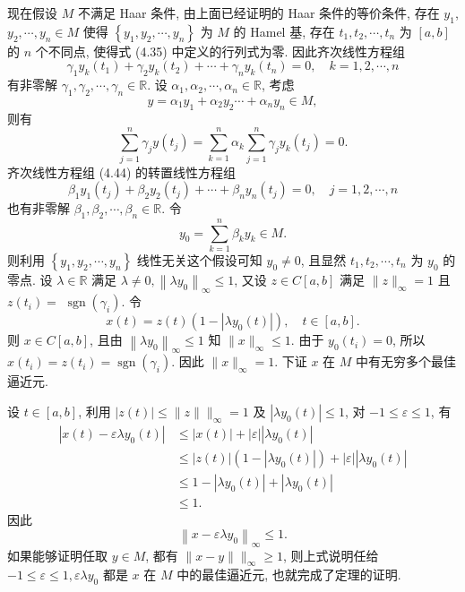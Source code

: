 \documentclass[openany]{ctexbook}
\makeatletter
\theoremstyle{kaiti}
\theoremstyle{normal}
\renewenvironment{proof}[1][\proofname]{\par
    \pushQED{\qed}%
    \normalfont \topsep6\p@\@plus6\p@\relax
    \trivlist
    \item\relax
    {\heiti #1}\hspace{2\labelsep}\ignorespaces
  }{%
    \popQED\endtrivlist\@endpefalse
  }
\makeatother
\begin{document}
\begin{proof}
现在假设 $M$ 不满足 Haar 条件, 由上面已经证明的 Haar 条件的等价条件, 存在 $y_1$, $y_2, \cdots, y_n \in M$ 使得 $\left\{y_1, y_2, \cdots, y_n\right\}$ 为 $M$ 的 Hamel 基, 存在 $t_1, t_2, \cdots, t_n$ 为 $[a, b]$ 的 $n$ 个不同点, 使得式 (4.35) 中定义的行列式为零. 因此齐次线性方程组
\begin{equation}
  \gamma_1 y_{k}\left(t_1\right)+\gamma_2 y_{k}\left(t_2\right)+\cdots+\gamma_n y_{k}\left(t_n\right)=0, \quad k=1,2, \cdots, n
\end{equation}
有非零解 $\gamma_1, \gamma_2, \cdots, \gamma_n \in \mathbb{R}$. 设 $\alpha_1, \alpha_2, \cdots, \alpha_n \in \mathbb{R}$, 考虑
$$
y=\alpha_1 y_1+\alpha_2 y_2 \cdots+\alpha_n y_n \in M,
$$
则有
\begin{equation}
  \sum_{j=1}^n \gamma_{j} y\left(t_{j}\right)=\sum_{k=1}^n \alpha_{k} \sum_{j=1}^n \gamma_{j} y_{k}\left(t_{j}\right)=0.
\end{equation}
齐次线性方程组 (4.44) 的转置线性方程组
$$
\beta_1 y_1\left(t_{j}\right)+\beta_2 y_2\left(t_{j}\right)+\cdots+\beta_n y_n\left(t_{j}\right)=0, \quad j=1,2, \cdots, n
$$
也有非零解 $\beta_1, \beta_2, \cdots, \beta_n \in \mathbb{R}$. 令
$$
y_0=\sum_{k=1}^n \beta_{k} y_{k} \in M.
$$
则利用 $\left\{y_1, y_2, \cdots, y_n\right\}$ 线性无关这个假设可知 $y_0 \neq 0$, 且显然 $t_1, t_2, \cdots, t_n$ 为 $y_0$ 的零点. 设 $\lambda \in \mathbb{R}$ 满足 $\lambda \neq 0,\left\|\lambda y_0\right\|_{\infty} \leqslant 1$, 又设 $z \in C[a, b]$ 满足 $\|z\|_{\infty}=1$ 且 $z\left(t_{i}\right)=$ $\operatorname{sgn}\left(\gamma_{i}\right)$. 令
$$
x(t)=z(t)\left(1-\left|\lambda y_0(t)\right|\right), \quad t \in[a, b].
$$
则 $x \in C[a, b]$, 且由 $\left\|\lambda y_0\right\|_{\infty} \leqslant 1$ 知 $\|x\|_{\infty} \leqslant 1$. 由于 $y_0\left(t_{i}\right)=0$, 所以 $x\left(t_{i}\right)=z\left(t_{i}\right)=\operatorname{sgn}\left(\gamma_{i}\right)$. 因此 $\|x\|_{\infty}=1$. 下证 $x$ 在 $M$ 中有无穷多个最佳逼近元.

设 $t \in[a, b]$, 利用 $|z(t)| \leqslant\|z\| \|_{\infty}=1$ 及 $\left|\lambda y_0(t)\right| \leqslant 1$, 对 $-1 \leqslant \varepsilon \leqslant 1$, 有
$$
\begin{aligned}
\left|x(t)-\varepsilon \lambda y_0(t)\right| & \leqslant|x(t)|+|\varepsilon|\left|\lambda y_0(t)\right| \\
& \leqslant|z(t)|\left(1-\left|\lambda y_0(t)\right|\right)+|\varepsilon|\left|\lambda y_0(t)\right| \\
& \leqslant 1-\left|\lambda y_0(t)\right|+\left|\lambda y_0(t)\right| \\
& \leqslant 1.
\end{aligned}
$$
因此
$$
\left\|x-\varepsilon \lambda y_0\right\|_{\infty} \leqslant 1.
$$
如果能够证明任取 $y \in M$, 都有 $\|x-y\| \|_{\infty} \geqslant 1$, 则上式说明任给 $-1 \leqslant \varepsilon \leqslant 1, \varepsilon \lambda y_0$ 都是 $x$ 在 $M$ 中的最佳逼近元, 也就完成了定理的证明.


\end{proof}
\end{document}
